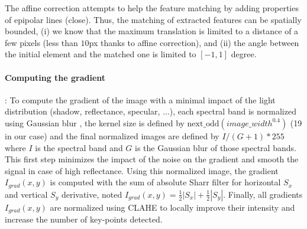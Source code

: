 \documentclass[a4paper,twoside]{article}
\begin{document}
	\par The affine correction attempts to help the feature matching by adding properties of epipolar lines (close).
	Thus, the matching of extracted features can be spatially bounded,
	(i) we know that the maximum translation is limited to a distance of a few pixels (less than $10$px thanks to affine correction),
	and (ii) the angle between the initial element and the matched one is limited to $[-1,1]$ degree.
	
	\paragraph{Computing the gradient} : \label{sec:pre-processing}
	To compute the gradient of the image with a minimal impact of the light distribution (shadow, reflectance, specular, ...),
	each spectral band is normalized using Gaussian blur \cite{sage0303}, the kernel size is defined by $\text{next\_odd}(image\_width^{0.4})$ (19 in our case)
	and the final normalized images are defined by $I/(G+1)*255$ where $I$ is the spectral band and $G$ is the Gaussian blur of those spectral bands.
	This first step minimizes the impact of the noise on the gradient and smooth the signal in case of high reflectance.
	Using this normalized image, the gradient $I_{grad}(x,y)$ is computed with the sum of absolute Sharr filter \cite{Seitz}
	for horizontal $S_x$ and vertical $S_y$ derivative, noted $I_{grad}(x,y)=\frac{1}{2}|S_x|+\frac{1}{2}|S_y|$.
	Finally, all gradients $I_{grad}(x,y)$ are normalized using CLAHE \cite{zuiderveld1994contrast} to locally improve their intensity and increase the number of key-points detected.%
	
\end{document}
